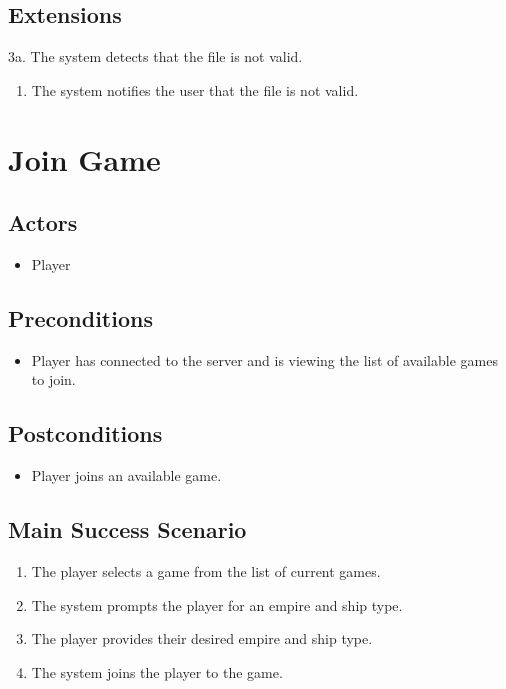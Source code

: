 \subsection{Extensions}
3a. The system detects that the file is not valid.
\begin{enumerate}
	\item The system notifies the user that the file is not valid.
\end{enumerate}

\section{Join Game}

\subsection{Actors}
\begin{itemize}
	\item{Player}
\end{itemize}

\subsection{Preconditions}
\begin{itemize}
	\item Player has connected to the server and is viewing the list of available games to join.
\end{itemize}

\subsection{Postconditions}
\begin{itemize}
	\item Player joins an available game.
\end{itemize}

\subsection{Main Success Scenario}
\begin{enumerate}
	\item The player selects a game from the list of current games.
	\item The system prompts the player for an empire and ship type.
	\item The player provides their desired empire and ship type.
	\item The system joins the player to the game.
\end{enumerate}

